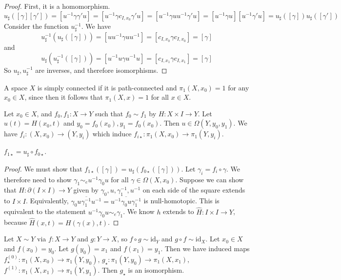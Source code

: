 \begin{proof}
	First, it is a homomorphism.
	\[ u_\sharp([\gamma][\gamma']) = [u^{-1}\gamma \gamma' u] = [u^{-1}\gamma c_{I,x_0}\gamma' u] = [u^{-1}\gamma u u^{-1} \gamma' u] = [u^{-1}\gamma u][u^{-1}\gamma' u] = u_\sharp([\gamma])u_\sharp([\gamma']) \]
	Consider the function \( u^{-1}_\sharp \).
	We have
	\[ u^{-1}_\sharp(u_\sharp([\gamma])) = [uu^{-1}\gamma uu^{-1}] = [c_{I,x_0} \gamma c_{I,x_0}] = [\gamma] \]
	and
	\[ u_\sharp(u^{-1}_\sharp([\gamma])) = [u^{-1}u\gamma u^{-1}u] = [c_{I,x_1} \gamma c_{I,x_1}] = [\gamma] \]
	So \( u_\sharp, u^{-1}_\sharp \) are inverses, and therefore isomorphisms.
\end{proof}
\begin{corollary}
	A space \( X \) is simply connected if it is path-connected and \( \pi_1(X,x_0) = 1 \) for any \( x_0 \in X \), since then it follows that \( \pi_1(X,x) = 1 \) for all \( x \in X \).
\end{corollary}
Let \( x_0 \in X \), and \( f_0, f_1 \colon X \to Y \) such that \( f_0 \sim f_1 \) by \( H \colon X \times I \to Y \).
Let \( u(t) = H(x_0,t) \) and \( y_0 = f_0(x_0), y_1 = f_0(x_0) \).
Then \( u \in \Omega(Y,y_0,y_1) \).
We have \( f_i \colon (X,x_0) \to (Y,y_i) \) which induce \( f_{i\star} \colon \pi_1(X,x_0) \to \pi_1(Y,y_i) \).
\begin{theorem}
	\( f_{1\star} = u_\sharp \circ f_{0\star} \).
\end{theorem}
\begin{proof}
	We must show that \( f_{1\star}([\gamma]) = u_\sharp(f_{0\star}([\gamma])) \).
	Let \( \gamma_i = f_i \circ \gamma \).
	We therefore need to show \( \gamma_1 \sim_e u^{-1} \gamma_0 u \) for all \( \gamma \in \Omega(X,x_0) \).
	Suppose we can show that \( H \colon \partial (I \times I) \to Y \) given by \( \gamma_0, u, \gamma_1^{-1}, u^{-1} \) on each side of the square extends to \( I \times I \).
	Equivalently, \( \overline{\gamma_0 u \gamma_1^{-1} u^{-1}} = \overline{u^{-1}\gamma_0 u \gamma_1^{-1}} \) is null-homotopic.
	This is equivalent to the statement \( u^{-1}\gamma_0 u \sim_e \gamma_1 \).
	We know \( h \) extends to \( \hat H \colon I \times I \to Y \), because \( \hat H(x,t) = H(\gamma(x),t) \).
\end{proof}
\begin{corollary}
	Let \( X \sim Y \) via \( f : X \to Y \) and \( g \colon Y \to X \), so \( f \circ g \sim \mathrm{id}_Y \) and \( g \circ f \sim \mathrm{id}_X \).
	Let \( x_0 \in X \) and \( f(x_0) = y_0 \).
	Let \( g(y_0) = x_1 \) and \( f(x_1) = y_1 \).
	Then we have induced maps \( f^{(0)}_\star \colon \pi_1(X,x_0) \to \pi_1(Y,y_0) \), \( g_\star \colon \pi_1(Y,y_0) \to \pi_1(X,x_1) \), \( f^{(1)} \colon \pi_1(X,x_1) \to \pi_1(Y,y_1) \).
	Then \( g_\star \) is an isomorphism.
\end{corollary}
